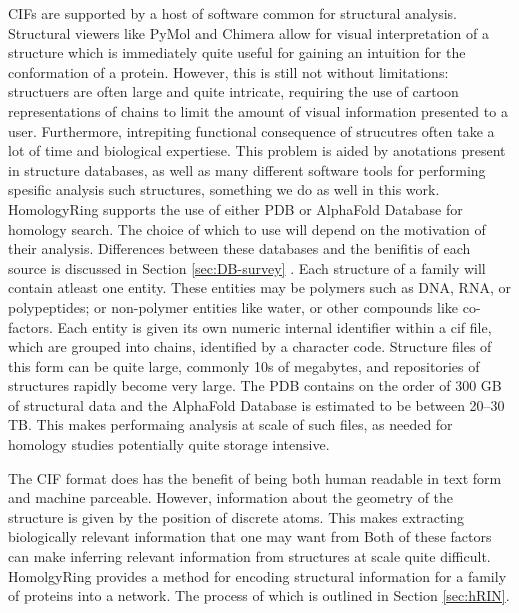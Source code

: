 CIFs are supported by a host of software common for structural analysis. Structural viewers like PyMol and Chimera  allow for visual interpretation of a structure which is immediately quite useful for gaining an intuition for the conformation of a protein. However, this is still not without limitations: structuers are often large and quite intricate, requiring the use of cartoon representations of chains to limit the amount of visual information presented to a user. Furthermore, intrepiting functional consequence of strucutres often take a lot of time and biological expertiese. This problem is aided by anotations present in structure databases, as well as many different software tools for performing spesific analysis such structures, something we do as well in this work. %
HomologyRing supports the use of either PDB or AlphaFold Database for homology search. The choice of which to use will depend on the motivation of their analysis. Differences between these databases and the benifitis of each source is discussed in Section \ref{sec:DB-survey}
.%
Each structure of a family will contain atleast one entity. These entities may be polymers such as DNA, RNA, or polypeptides; or non-polymer entities like water, or other compounds like co-factors. Each entity is given its own numeric internal identifier within a cif file, which are grouped into chains, identified by a character code. 
Structure files of this form can be quite large, commonly 10s of megabytes, and repositories of structures rapidly become very large.
The PDB contains on the order of 300 GB of structural data and the AlphaFold Database is estimated to be between 20--30 TB. 
This makes performaing analysis at scale of such files, as needed for homology studies potentially quite storage intensive.

The CIF format does has the benefit of being both human readable in text form and machine parceable. However, information about the geometry of the structure is given by the position of discrete atoms. This makes extracting biologically relevant information that one may want from 
Both of these factors can make inferring relevant information from structures at scale quite difficult. HomolgyRing provides a method for encoding structural information for a family of proteins into a network. The process of which is outlined in Section \ref{sec:hRIN}.

